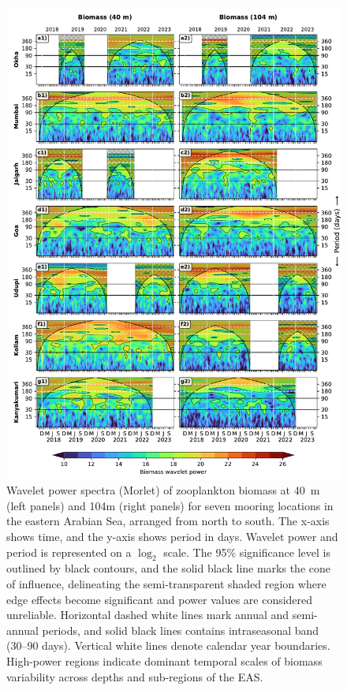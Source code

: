 \documentclass[authoryear,review,11pt]{elsarticle}
\begin{document}
\begin{figure}[htbp]
	\centering
	\includegraphics[width=\textwidth]{./fig_06_wavelet_40m_104m.pdf} 
	\captionsetup{justification=justified,font=footnotesize,skip=0.05\baselineskip,width=\textwidth}
	\caption{Wavelet power spectra (Morlet) of zooplankton biomass at 40~m (left panels) and 104m (right panels) for seven mooring locations in the eastern Arabian Sea, arranged from north to south. The x-axis shows time, and the y-axis shows period in days. Wavelet power and period is represented on a $\log_2$ scale. The 95\% significance level is outlined by black contours, and the solid black line marks the cone of influence, delineating the semi-transparent shaded region where edge effects become significant and power values are considered unreliable. Horizontal dashed white lines mark annual and semi-annual periods,  and solid black lines contains intraseasonal band (30--90 days). Vertical white lines denote calendar year boundaries. High-power regions indicate dominant temporal scales of biomass variability across depths and sub-regions of the EAS.}
	\label{fig:wavelet_40m_104m}
\end{figure}
\end{document}
